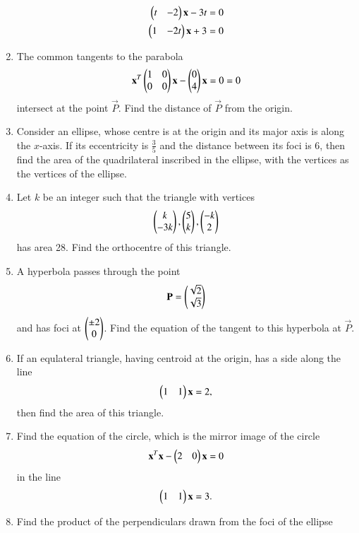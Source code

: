 \documentclass[journal,12pt,twocolumn]{IEEEtran}
\begin{document}
\begin{enumerate}[label=\arabic*.]
\begin{align}
\begin{pmatrix}t & -2 \end{pmatrix}\mathbf{x} -3t &= 0
\\
\begin{pmatrix}1 & -2t \end{pmatrix}\mathbf{x} +3 &= 0
\end{align}
\item The common tangents to the parabola
\begin{equation}
\mathbf{x}^T\begin{pmatrix}1 & 0 \\ 0 & 0\end{pmatrix}\mathbf{x} -\begin{pmatrix}0\\ 4 \end{pmatrix}\mathbf{x} = 0
 = 0
\end{equation}
%
intersect at the point $\vec{P}$.  Find the distance of $\vec{P}$ from the origin.
\item  Consider an ellipse, whose centre is at the origin and its major axis is along the $x$-axis.  If its 
eccentricity is $\frac{3}{5}$ and the distance between its foci is 6, then find the area of the quadrilateral 
inscribed in the ellipse,  with the vertices as the vertices of the ellipse.
\item Let $k$ be an integer such that the triangle with vertices
\begin{equation}
\begin{pmatrix}k\\-3k\end{pmatrix},
\begin{pmatrix}5\\k\end{pmatrix},
\begin{pmatrix}-k\\2\end{pmatrix}
\end{equation}
has area 28.  Find the orthocentre of this triangle.
\item A hyperbola passes through the point 
\begin{equation}
\mathbf{P}=\begin{pmatrix}\sqrt{2}\\ \sqrt{3}\end{pmatrix}
\end{equation}
and has foci at $\begin{pmatrix}\pm 2\\ 0\end{pmatrix}$.  Find the equation of the tangent to this hyperbola at 
$\vec{P}$.
\item If an equlateral triangle, having centroid at the origin, has a side along the line
\begin{equation}
\begin{pmatrix}1 & 1\end{pmatrix}\mathbf{x} = 2,
\end{equation}
then find the area of this triangle.
\item Find the equation of the circle, which is the mirror image of the circle
\begin{equation}
\mathbf{x}^T\mathbf{x} -\begin{pmatrix}2 & 0 \end{pmatrix}\mathbf{x} = 0
\end{equation}
in the line
\begin{equation}
\begin{pmatrix}1 & 1\end{pmatrix}\mathbf{x} = 3.
\end{equation}
\item Find the product of the perpendiculars drawn from the foci of the ellipse

\end{enumerate}
\end{document}
